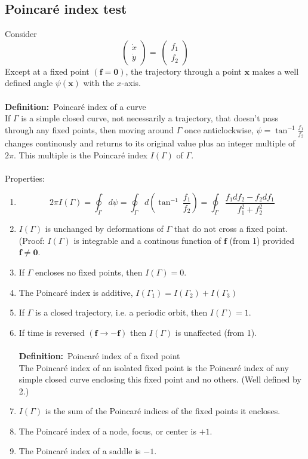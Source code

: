 \documentclass{article}
\newcommand{\definition}{\textbf{Definition:}}              %
\newcommand{\bx}{\bm{x}}                                    %
\begin{document}
\subsection{Poincar\'{e} index test}
Consider 
\[ \left( \begin{array}{c} \dot{x} \\ \dot{y} \end{array} \right) = \
 \left( \begin{array}{c} f_1 \\ f_2 \end{array} \right) \]
Except at a fixed point $(\bm{f} = \bm{0})$, the trajectory through a point
$\bx$ makes a well defined angle $\psi(\bx)$ with the $x$-axis.
\\
\\
\definition\ Poincar\'e index of a curve
\\
If $\Gamma$ is a simple closed curve, not necessarily a trajectory, that
doesn't pass through any fixed points,  then moving around $\Gamma$ once
anticlockwise, $\displaystyle \psi = \tan^{-1} \frac{f_1}{f_2}$ changes 
continously and returns to its original value plus an integer multiple of
$2\pi$. This multiple is the Poincar\'e index $I(\Gamma)$ of $\Gamma$.
\\
\\
Properties:
\begin{enumerate}[1.]
\item %
\[ 2\pi I(\Gamma) = \oint_{\Gamma} d\psi = \oint_{\Gamma} d\left( \tan^{-1} \
\frac{f_1}{f_2} \right) = \oint_{\Gamma} \frac{ f_1 df_2 - f_2 df_1}{f_1^2 + f_2^2} \]
\item $I(\Gamma)$ is unchanged by deformations of $\Gamma$ that do not cross 
a fixed point. 
\\
(Proof: $I(\Gamma)$ is integrable and a continous function of $\bm{f}$
(from 1) provided $\bm{f} \neq \bm{0}$.
\item If $\Gamma$ encloses no fixed points, then $I(\Gamma) =0$.
\item The Poincar\'e index is additive,
$I(\Gamma_1) = I(\Gamma_2) + I(\Gamma_3)$
\item If $\Gamma$ is a closed trajectory, i.e. a periodic orbit, then 
$I(\Gamma)=1$. %
\item If time is reversed $(\bm{f} \to -\bm{f})$ then $I(\Gamma)$ is unaffected
(from 1).
\\
\\
\definition\ Poincar\'e index of a fixed point
\\
The Poincar\'e index of an isolated fixed point is the Poincar\'e index of any
simple closed curve enclosing this fixed point and no others. (Well defined by 
2.)
\\
\item $I(\Gamma)$ is the sum of the Poincar\'e indices of the fixed points it 
encloses.
\item The Poincar\'e index of a node, focus, or center is $+1$.
\item The Poincar\'e index of a saddle is $-1$.
\end{enumerate}
\end{document}
